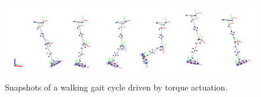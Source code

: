 \begin{figure}[t!]
\centering
\includegraphics[width=\textwidth]{figures/multiphase_walking_cycle.png}\\
\caption{Snapshots of a walking gait cycle driven by torque actuation.}
\label{fig:snapshots_multiphase_walking_cycle}
\end{figure}

